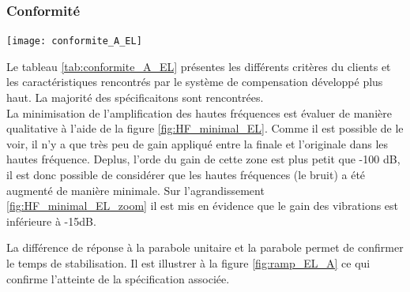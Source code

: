 \documentclass{udes_rapport} %
\begin{document}
\subsubsection{Conformité}
\begin{center}
  \label{tab:conformite_A_EL}
  \texttt{[image: conformite\_A\_EL]}
\end{center}
Le tableau \ref{tab:conformite_A_EL} présentes les différents critères du clients et les caractéristiques rencontrés par le système de compensation développé plus haut. La majorité des spécificaitons sont rencontrées.\\
La minimisation de l'amplification des hautes fréquences est évaluer de manière qualitative à l'aide de la figure \ref{fig:HF_minimal_EL}. Comme il est possible de le voir, il n'y a que très peu de gain appliqué entre la finale et l'originale dans les hautes fréquence. Deplus, l'orde du gain de cette zone est plus petit que -100 dB, il est donc possible de considérer que les hautes fréquences (le bruit) a été augmenté de manière minimale. Sur l'agrandissement \ref{fig:HF_minimal_EL_zoom} il est mis en évidence que le gain des vibrations est inférieure à -15dB.


La différence de réponse à la parabole unitaire et la parabole permet de confirmer le temps de stabilisation. Il est illustrer à la figure \ref{fig:ramp_EL_A} ce qui confirme l'atteinte de la spécification associée.
\end{document}
